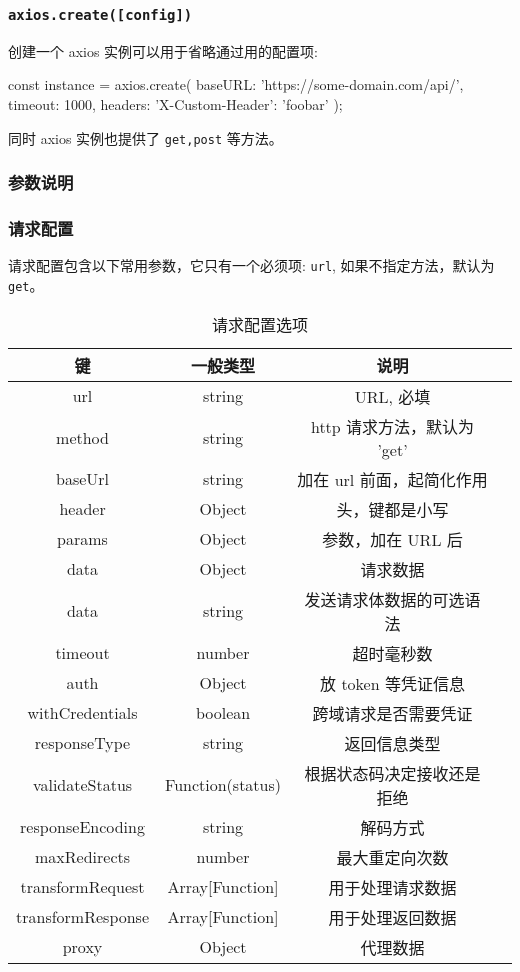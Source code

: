 \subsubsection*{\texttt{axios.create([config])}}

创建一个 axios 实例可以用于省略通过用的配置项:

\begin{JavaScript}
const instance = axios.create({
  baseURL: 'https://some-domain.com/api/',
  timeout: 1000,
  headers: {'X-Custom-Header': 'foobar'}
});
\end{JavaScript}

同时 axios 实例也提供了 \texttt{get,post} 等方法。

\subsubsection{参数说明}

\subsubsection*{请求配置}

请求配置包含以下常用参数，它只有一个必须项: \texttt{url}, 如果不指定方法，默认为 \texttt{get}。

\begin{table}[H]
  \small
  \centering
  \caption{请求配置选项}
  \label{table:请求配置选项}
  \setlength{\tabcolsep}{4mm}
  \begin{tabular}{c|ccc}
    \toprule
    \textbf{键} & \textbf{一般类型} & \textbf{说明} \\
    \midrule
    url & string & URL, 必填 \\
    method & string & http 请求方法，默认为 'get' \\
    baseUrl & string & 加在 url 前面，起简化作用 \\
    header & Object & 头，键都是小写 \\
    params & Object & 参数，加在 URL 后 \\
    data & Object & 请求数据 \\
    data & string & 发送请求体数据的可选语法 \\
    timeout & number & 超时毫秒数 \\
    auth & Object & 放 token 等凭证信息 \\
    \midrule
    withCredentials & boolean & 跨域请求是否需要凭证 \\
    responseType & string & 返回信息类型 \\
    validateStatus & Function(status) & 根据状态码决定接收还是拒绝 \\
    responseEncoding & string & 解码方式 \\
    maxRedirects & number & 最大重定向次数 \\
    transformRequest & Array[Function] & 用于处理请求数据 \\
    transformResponse & Array[Function] & 用于处理返回数据 \\
    proxy & Object & 代理数据 \\
    \bottomrule
  \end{tabular}
\end{table}

